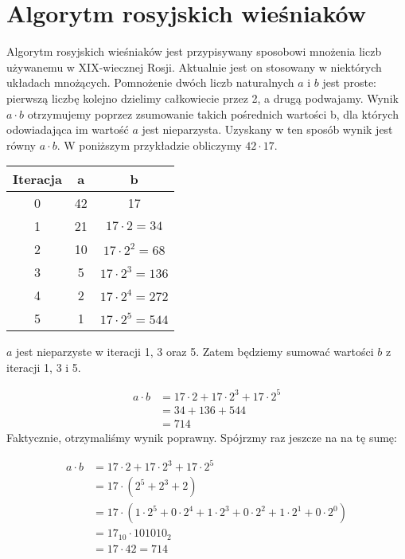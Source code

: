 \section{Algorytm rosyjskich wieśniaków}



Algorytm rosyjskich wieśniaków jest przypisywany sposobowi mnożenia liczb używanemu w XIX-wiecznej Rosji.
Aktualnie jest on stosowany w niektórych układach mnożących.
Pomnożenie dwóch liczb naturalnych $a$ i $b$ jest proste: pierwszą liczbę kolejno dzielimy całkowiecie przez 2, a drugą podwajamy.
Wynik $a \cdot b$ otrzymujemy poprzez zsumowanie takich pośrednich wartości b, dla których odowiadająca im wartość $a$ jest nieparzysta.
Uzyskany w ten sposób wynik jest równy $a \cdot b$.
W poniższym przykładzie obliczymy $42 \cdot 17$.

\begin{center}
\begin{tabular}{ |c|c|c| } 
 \hline
 Iteracja & a & b \\ 
 \hline
 0 & 42 & 17 \\ 
 1 & 21 & $17 \cdot 2 = 34$ \\
 2 & 10 & $17 \cdot 2^2 = 68$ \\
 3 & 5  & $17 \cdot 2^3 = 136$ \\
 4 & 2  & $17 \cdot 2^4 = 272$ \\
 5 & 1  & $17 \cdot 2^5 = 544$ \\
 
 \hline
\end{tabular}
\end{center}

$a$ jest nieparzyste w iteracji 1, 3 oraz 5. Zatem będziemy sumować wartości $b$ z iteracji 1, 3 i 5.

\begin{equation*} 
\begin{split}
a \cdot b &= 17\cdot2 + 17\cdot2^3 + 17\cdot2^5 \\
&= 34 + 136 + 544 \\
&= 714
\end{split}
\end{equation*}
Faktycznie, otrzymaliśmy wynik poprawny. Spójrzmy raz jeszcze na na tę sumę:

\begin{equation*} 
\begin{split}
a \cdot b &= 17\cdot2 + 17\cdot2^3 + 17\cdot2^5 \\
&= 17 \cdot ( 2^5 + 2^3 + 2) \\
&= 17 \cdot ( 1 \cdot 2^5 + 0 \cdot 2^4 + 1 \cdot 2^3 + 0 \cdot 2^2 + 1 \cdot 2^1 + 0 \cdot 2^0 ) \\
&=17_{10} \cdot 101010_2 \\
&=17 \cdot 42 = 714
\end{split}
\end{equation*}

